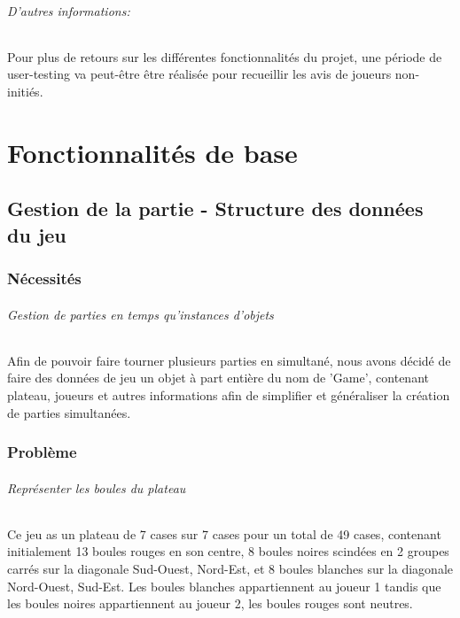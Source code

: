 \documentclass{scrreprt}
\begin{document}
	\paragraph{D'autres informations:} 
	
	Pour plus de retours sur les différentes fonctionnalités du projet, une période de user-testing va peut-être être réalisée pour recueillir les avis de joueurs non-initiés. 

\part{Fonctionnalités de base}

	\chapter{Gestion de la partie - Structure des données du jeu}
		\section{Nécessités}
			\paragraph{Gestion de parties en temps qu'instances d'objets}
			
			Afin de pouvoir faire tourner plusieurs parties en simultané, nous avons décidé de faire des données de jeu un objet à part entière du nom de 'Game', contenant plateau, joueurs et autres informations  afin de simplifier et généraliser la création de parties simultanées.
			
		\section{Problème}
			
			\paragraph{Représenter les boules du plateau} 
			
			Ce jeu as un plateau de 7 cases sur 7 cases pour un total de 49 cases, contenant initialement 13 boules rouges en son centre, 8 boules noires scindées en 2 groupes carrés sur la diagonale Sud-Ouest, Nord-Est, et 8 boules blanches sur la diagonale Nord-Ouest, Sud-Est. Les boules blanches appartiennent au joueur 1 tandis que les boules noires appartiennent au joueur 2, les boules rouges sont neutres.
			
\end{document}
